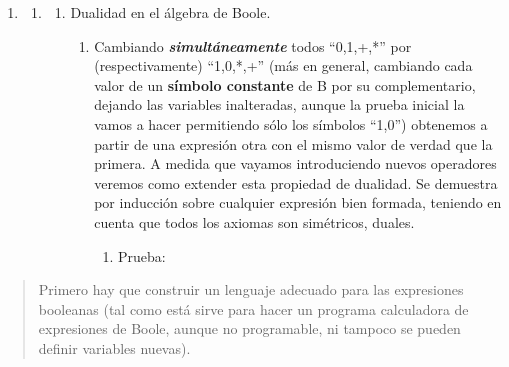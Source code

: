 \begin{enumerate}
\def\labelenumi{\arabic{enumi}.}
\item
  \begin{enumerate}
  \def\labelenumii{\arabic{enumii}.}
  \item
    \begin{enumerate}
    \def\labelenumiii{\arabic{enumiii}.}
    \item
      Dualidad en el álgebra de Boole.

      \begin{enumerate}
      \def\labelenumiv{\arabic{enumiv}.}
      \item
        Cambiando \emph{\textbf{simultáneamente}} todos ``0,1,+,*'' por
        (respectivamente) ``1,0,*,+'' (más en general, cambiando cada
        valor de un \textbf{símbolo constante} de B por su
        complementario, dejando las variables inalteradas, aunque la
        prueba inicial la vamos a hacer permitiendo sólo los símbolos
        ``1,0'') obtenemos a partir de una ex\-presión otra con el mismo
        valor de verdad que la primera. A medida que vaya\-mos
        introduciendo nuevos operadores veremos como extender esta
        propiedad de dualidad. Se demuestra por inducción sobre
        cualquier expresión bien formada, teniendo en cuenta que todos
        los axiomas son simétricos, duales.

        \begin{enumerate}
        \def\labelenumv{\arabic{enumv}.}
        \tightlist
        \item
          Prueba:
        \end{enumerate}
      \end{enumerate}
    \end{enumerate}
  \end{enumerate}
\end{enumerate}

\begin{quote}
Primero hay que construir un lenguaje adecuado para las expresiones
booleanas (tal como está sirve para hacer un programa calculadora de
expresiones de Boo\-le, aunque no programable, ni tampoco se pueden
definir variables nuevas).
\end{quote}

